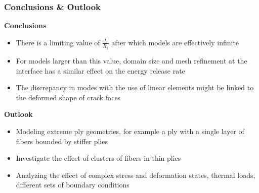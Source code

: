 \documentclass[first,firstsupp,lastsupp,last,hyperref,table]{ETHclass}
\begin{document}
\begin{frame}
\frametitle{\vspace*{0.5cm} Conclusions \& Outlook}
\vspace{-0.75cm}
\centering
\scriptsize
\begin{alertblock}{\footnotesize \bf{Conclusions}}
\begin{itemize}[label=]
  \item There is a limiting value of $\frac{L}{R_{f}}$ after which models are effectively infinite
	\item For models larger than this value, domain size and mesh refinement at the interface has a similar effect on the energy release rate
  \item The discrepancy in modes with the use of linear elements might be linked to the deformed shape of crack faces
\end{itemize}
\end{alertblock}
\begin{alertblock}{\footnotesize \bf{Outlook}}
\begin{itemize}[label=]
	\item Modeling extreme ply geometries, for example a ply with a single layer of fibers bounded by stiffer plies\\[9pt]
	\item Investigate the effect of clusters of fibers in thin plies\\[9pt]
	\item Analyzing the effect of complex stress and deformation states, thermal loads, different sets of boundary conditions
\end{itemize}
\end{alertblock}
\end{frame}






\end{document}
